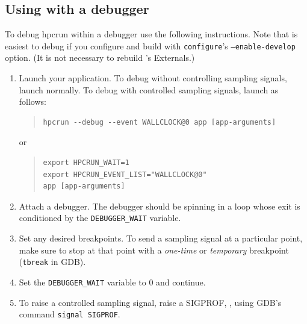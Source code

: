 \documentclass[11pt,letterpaper]{report}
\begin{document}
\subsection{Using \hpcrun{} with a debugger}

To debug hpcrun within a debugger use the following instructions.
Note that \hpcrun{} is easiest to debug if you configure and build \HPCToolkit{} with \texttt{configure}'s \texttt{--enable-develop} option.
(It is not necessary to rebuild \HPCToolkit{}'s Externals.)
%
\begin{enumerate}

\item Launch your application.
  To debug \hpcrun{} without controlling sampling signals, launch normally.
  To debug \hpcrun{} with controlled sampling signals, launch as follows:
\begin{quote}
\begin{verbatim}
hpcrun --debug --event WALLCLOCK@0 app [app-arguments]
\end{verbatim}
\end{quote}
or
\begin{quote}
\begin{verbatim}
export HPCRUN_WAIT=1
export HPCRUN_EVENT_LIST="WALLCLOCK@0"
app [app-arguments]
\end{verbatim}
\end{quote}

\item Attach a debugger.
  The debugger should be spinning in a loop whose exit is conditioned by the \verb|DEBUGGER_WAIT| variable.

\item Set any desired breakpoints.
  To send a sampling signal at a particular point, make sure to stop at that point with a \emph{one-time} or \emph{temporary} breakpoint (\texttt{tbreak} in GDB).

\item Set the \verb|DEBUGGER_WAIT| variable to 0 and continue.

\item To raise a controlled sampling signal, raise a SIGPROF, \eg{}, using GDB's command \verb|signal SIGPROF|.

\end{enumerate}


\end{document}
